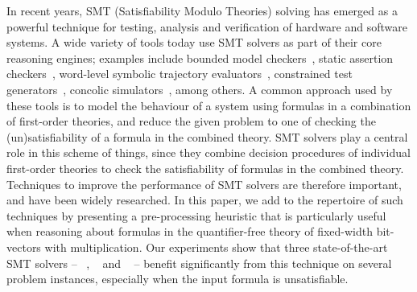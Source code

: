 %
In recent years, SMT (Satisfiability Modulo Theories) solving has
emerged as a powerful technique for testing, analysis and verification
of hardware and software systems.  A wide variety of tools today use
SMT solvers as part of their core reasoning engines; examples include
bounded model checkers~\cite{hwcbmc,boolector,ebmc,cbmc}, static
assertion checkers~\cite{corral,boogie}, word-level symbolic
trajectory evaluators~\cite{wste}, constrained test
generators~\cite{crv1,crv2,dart}, concolic simulators~\cite{concolic}, among
others.  A common approach used by these tools is to model the
behaviour of a system using formulas in a combination of first-order
theories, and reduce the given problem to one of checking the
(un)satisfiability of a formula in the combined theory.  SMT solvers
play a central role in this scheme of things, since they combine
decision procedures of individual first-order theories to check the
satisfiability of formulas in the combined theory.  Techniques to
improve the performance of SMT solvers are therefore important, and
have been widely researched. In this paper, we add to the repertoire
of such techniques by presenting a pre-processing heuristic that is
particularly useful when reasoning about formulas in the
quantifier-free theory of fixed-width bit-vectors with multiplication.
Our experiments show that three state-of-the-art SMT solvers --
{\zthree}~\cite{zthree}, {\cvcfour}~\cite{cvcfour} and
{\boolector}~\cite{boolector} -- benefit significantly from this
technique on several problem instances, especially when the input
formula is unsatisfiable.


